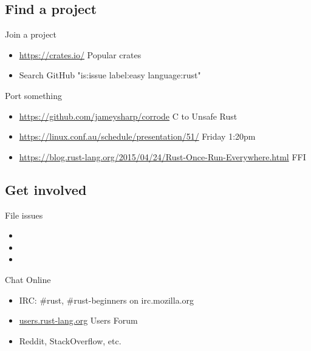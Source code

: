 \documentclass[xcolor={svgnames},hyperref]{beamer}
\begin{document}
\subsection{Find a project}

    \begin{frame}
        Join a project
        \begin{itemize}
            \item \url{https://crates.io/} Popular crates
            \item Search GitHub "is:issue label:easy language:rust"
        \end{itemize}
    \end{frame}

    \begin{frame}
        Port something
        \begin{itemize}
            \item \url{https://github.com/jameysharp/corrode} C to Unsafe Rust
            \item \url{https://linux.conf.au/schedule/presentation/51/} Friday 1:20pm
            \item \url{https://blog.rust-lang.org/2015/04/24/Rust-Once-Run-Everywhere.html} FFI
        \end{itemize}
    \end{frame}


\subsection{Get involved}

    \begin{frame}
        File issues
        \begin{itemize}
            \item
            \item
            \item
        \end{itemize}
    \end{frame}

    \begin{frame}
        Chat Online
        \begin{itemize}
            \item IRC: #rust, #rust-beginners on irc.mozilla.org
            \item \url{users.rust-lang.org} Users Forum
            \item Reddit, StackOverflow, etc.
        \end{itemize}
    \end{frame}
\end{document}
